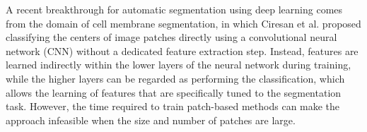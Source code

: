 % 
% 

A recent breakthrough for automatic segmentation using deep learning comes from
the domain of cell membrane segmentation, in which Ciresan et al.
\cite{Ciresan2012} proposed classifying the centers of image patches directly
using a convolutional neural network (CNN) \cite{LeCun1998} without a dedicated
feature extraction step. Instead, features are learned indirectly within the
lower layers of the neural network during training, while the higher layers can
be regarded as performing the classification, which allows the learning of
features that are specifically tuned to the segmentation task. However, the time
required to train patch-based methods can make the approach infeasible when the
size and number of patches are large.


